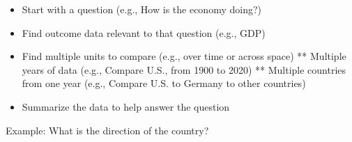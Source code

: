 \documentclass[]{book}
\providecommand{\tightlist}{%
  \setlength{\itemsep}{0pt}\setlength{\parskip}{0pt}}
\begin{document}
\begin{itemize}
\tightlist
\item
  Start with a question (e.g., How is the economy doing?)
\item
  Find outcome data relevant to that question (e.g., GDP)
\item
  Find multiple units to compare (e.g., over time or across space)
  ** Multiple years of data (e.g., Compare U.S., from 1900 to 2020)
  ** Multiple countries from one year (e.g., Compare U.S. to Germany to other countries)
\item
  Summarize the data to help answer the question
\end{itemize}

Example: What is the direction of the country?
\end{document}
